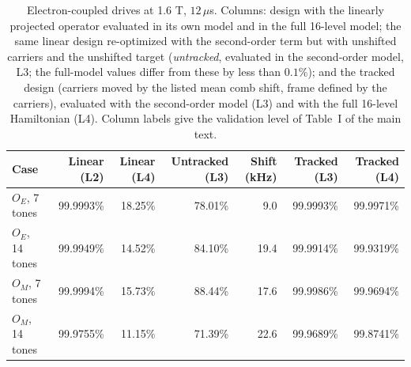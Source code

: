 \begin{table}[htbp]
\centering
\footnotesize
\setlength{\tabcolsep}{4pt}
\caption{Electron-coupled drives at 1.6 T, $12\,\mu$s. Columns: design with the linearly projected operator evaluated in its own model and in the full 16-level model; the same linear design re-optimized with the second-order term but with unshifted carriers and the unshifted target (\emph{untracked}, evaluated in the second-order model, L3; the full-model values differ from these by less than $0.1\%$); and the tracked design (carriers moved by the listed mean comb shift, frame defined by the carriers), evaluated with the second-order model (L3) and with the full 16-level Hamiltonian (L4). Column labels give the validation level of Table~I of the main text.}\label{tab:stark}
\begin{tabular}{lrrrrrr}
\toprule
Case & Linear (L2) & Linear (L4) & Untracked (L3) & Shift (kHz) & Tracked (L3) & Tracked (L4) \\
\midrule
$O_E$, 7 tones & 99.9993\% & 18.25\% & 78.01\% & 9.0 & 99.9993\% & 99.9971\% \\
$O_E$, 14 tones & 99.9949\% & 14.52\% & 84.10\% & 19.4 & 99.9914\% & 99.9319\% \\
$O_M$, 7 tones & 99.9994\% & 15.73\% & 88.44\% & 17.6 & 99.9986\% & 99.9694\% \\
$O_M$, 14 tones & 99.9755\% & 11.15\% & 71.39\% & 22.6 & 99.9689\% & 99.8741\% \\
\bottomrule
\end{tabular}
\end{table}
